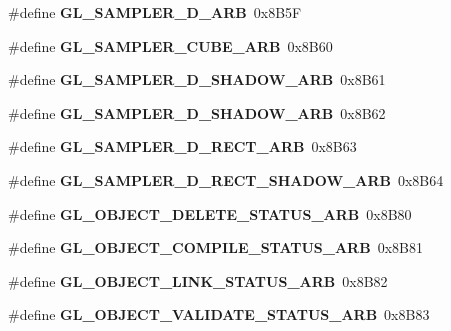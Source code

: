 \begin{DoxyCompactItemize}
\item 
\#define {\bfseries G\+L\+\_\+\+S\+A\+M\+P\+L\+E\+R\+\_\+D\+\_\+\+A\+R\+B}~0x8\+B5\+F\label{_s_d_l__opengl_8h_a205f07f97238c524151f81b3ce97534a}

\item 
\#define {\bfseries G\+L\+\_\+\+S\+A\+M\+P\+L\+E\+R\+\_\+\+C\+U\+B\+E\+\_\+\+A\+R\+B}~0x8\+B60\label{_s_d_l__opengl_8h_a6c42683d7fe8fd657926645eb5f96c8a}

\item 
\#define {\bfseries G\+L\+\_\+\+S\+A\+M\+P\+L\+E\+R\+\_\+D\+\_\+\+S\+H\+A\+D\+O\+W\+\_\+\+A\+R\+B}~0x8\+B61\label{_s_d_l__opengl_8h_aa090f78b398c5bec41e8007fa01ac750}

\item 
\#define {\bfseries G\+L\+\_\+\+S\+A\+M\+P\+L\+E\+R\+\_\+D\+\_\+\+S\+H\+A\+D\+O\+W\+\_\+\+A\+R\+B}~0x8\+B62\label{_s_d_l__opengl_8h_a75c4dbe7bfc18f7a44bd6211fa868bb7}

\item 
\#define {\bfseries G\+L\+\_\+\+S\+A\+M\+P\+L\+E\+R\+\_\+D\+\_\+\+R\+E\+C\+T\+\_\+\+A\+R\+B}~0x8\+B63\label{_s_d_l__opengl_8h_aad6df9e9229dd5b3d827b329ecfd3a1d}

\item 
\#define {\bfseries G\+L\+\_\+\+S\+A\+M\+P\+L\+E\+R\+\_\+D\+\_\+\+R\+E\+C\+T\+\_\+\+S\+H\+A\+D\+O\+W\+\_\+\+A\+R\+B}~0x8\+B64\label{_s_d_l__opengl_8h_ac6276cc957c6eb10cf6d6cd528acf1c6}

\item 
\#define {\bfseries G\+L\+\_\+\+O\+B\+J\+E\+C\+T\+\_\+\+D\+E\+L\+E\+T\+E\+\_\+\+S\+T\+A\+T\+U\+S\+\_\+\+A\+R\+B}~0x8\+B80\label{_s_d_l__opengl_8h_af1fdb7f5aae5d8d729a1cecadefc1d36}

\item 
\#define {\bfseries G\+L\+\_\+\+O\+B\+J\+E\+C\+T\+\_\+\+C\+O\+M\+P\+I\+L\+E\+\_\+\+S\+T\+A\+T\+U\+S\+\_\+\+A\+R\+B}~0x8\+B81\label{_s_d_l__opengl_8h_a631e9e70a5429e15a85299dd91977360}

\item 
\#define {\bfseries G\+L\+\_\+\+O\+B\+J\+E\+C\+T\+\_\+\+L\+I\+N\+K\+\_\+\+S\+T\+A\+T\+U\+S\+\_\+\+A\+R\+B}~0x8\+B82\label{_s_d_l__opengl_8h_a7d08a14c95fd192b889cac7455bb3415}

\item 
\#define {\bfseries G\+L\+\_\+\+O\+B\+J\+E\+C\+T\+\_\+\+V\+A\+L\+I\+D\+A\+T\+E\+\_\+\+S\+T\+A\+T\+U\+S\+\_\+\+A\+R\+B}~0x8\+B83\label{_s_d_l__opengl_8h_a6fb6c19e9f5ed84b8b964250071e1bdd}


\end{DoxyCompactItemize}
